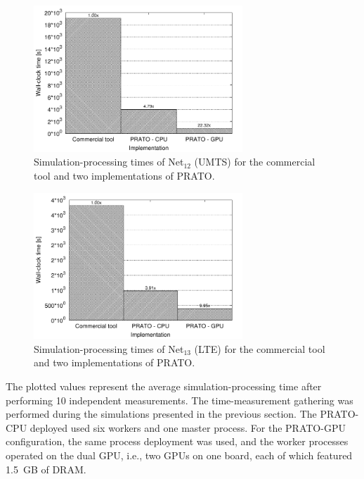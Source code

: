 \begin{figure}[h]
\centering

\includegraphics[width=0.7\textwidth]{08-real_network_planning/img/umts_running_times}

\caption{Simulation-processing times of Net$_{12}$ (UMTS) for the commercial
tool and two implementations of PRATO. \label{fig:08-Running_times-UMTS}}
\end{figure}


\begin{figure}[h]
\centering

\includegraphics[width=0.7\textwidth]{08-real_network_planning/img/lte_running_times}

\caption{Simulation-processing times of Net$_{13}$ (LTE) for the commercial
tool and two implementations of PRATO. \label{fig:08-Running_times-LTE}}
\end{figure}


The plotted values represent the average simulation-processing time
after performing 10 independent measurements. The time-measurement
gathering was performed during the simulations presented in the previous
section. The PRATO-CPU deployed used six workers and one master process.
For the PRATO-GPU configuration, the same process deployment was used,
and the worker processes operated on the dual GPU, i.e., two GPUs
on one board, each of which featured 1.5~GB of DRAM. 

